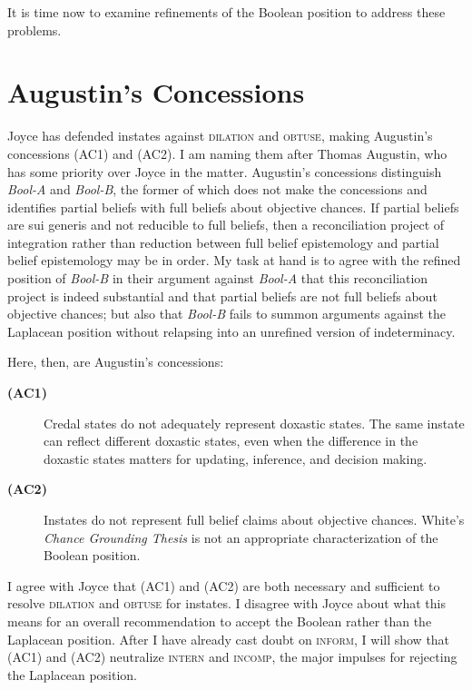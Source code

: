 \documentclass[11pt]{article}
\newcommand{\anderson}[0]{\textit{Bool-A}}
\newcommand{\augustin}[0]{\textit{Bool-B}}
\begin{document}
It is time now to examine refinements of the Boolean position to
address these problems.

\section{Augustin's Concessions}
\label{AugustinsConcessions}

Joyce has defended instates against \textsc{dilation} and
\textsc{obtuse}, making Augustin's concessions (AC1) and (AC2). I am
naming them after Thomas Augustin, who has some priority over Joyce in
the matter. Augustin's concessions distinguish {\anderson} and
{\augustin}, the former of which does not make the concessions and
identifies partial beliefs with full beliefs about objective chances.
If partial beliefs are sui generis and not reducible to full beliefs,
then a reconciliation project of integration rather than reduction
between full belief epistemology and partial belief epistemology may
be in order. My task at hand is to agree with the refined position of
{\augustin} in their argument against {\anderson} that this
reconciliation project is indeed substantial and that partial beliefs
are not full beliefs about objective chances; but also that
{\augustin} fails to summon arguments against the Laplacean position
without relapsing into an unrefined version of indeterminacy.

Here, then, are Augustin's concessions:

\begin{description}
\item[{\bf (AC1)}] Credal states do not adequately represent doxastic
  states. The same instate can reflect different doxastic states, even
  when the difference in the doxastic states matters for updating,
  inference, and decision making.
\item[{\bf (AC2)}] Instates do not represent full belief claims about
  objective chances. White's \emph{Chance Grounding Thesis} is not an
  appropriate characterization of the Boolean position.
\end{description}

I agree with Joyce that (AC1) and (AC2) are both necessary and
sufficient to resolve \textsc{dilation} and \textsc{obtuse} for
instates. I disagree with Joyce about what this means for an overall
recommendation to accept the Boolean rather than the Laplacean
position. After I have already cast doubt on \textsc{inform}, I will
show that (AC1) and (AC2) neutralize \textsc{intern} and
\textsc{incomp}, the major impulses for rejecting the Laplacean
position. 
\end{document}
